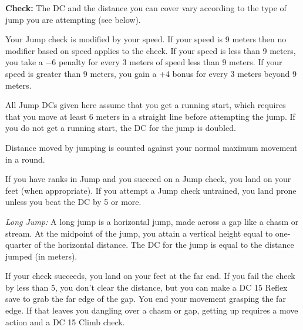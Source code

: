\textbf{Check:} The DC and the distance you can cover vary according to the type of jump you are attempting (see below).

Your Jump check is modified by your speed. If your speed is 9 meters then no modifier based on speed applies to the check. If your speed is less than 9 meters, you take a $-6$ penalty for every 3 meters of speed less than 9 meters. If your speed is greater than 9 meters, you gain a +4 bonus for every 3 meters beyond 9 meters.

All Jump DCs given here assume that you get a running start, which requires that you move at least 6 meters in a straight line before attempting the jump. If you do not get a running start, the DC for the jump is doubled.

Distance moved by jumping is counted against your normal maximum movement in a round.

If you have ranks in Jump and you succeed on a Jump check, you land on your feet (when appropriate). If you attempt a Jump check untrained, you land prone unless you beat the DC by 5 or more.


\textit{Long Jump:} A long jump is a horizontal jump, made across a gap like a chasm or stream. At the midpoint of the jump, you attain a vertical height equal to one-quarter of the horizontal distance. The DC for the jump is equal to the distance jumped (in meters).

If your check succeeds, you land on your feet at the far end. If you fail the check by less than 5, you don't clear the distance, but you can make a DC 15 Reflex save to grab the far edge of the gap. You end your movement grasping the far edge. If that leaves you dangling over a chasm or gap, getting up requires a move action and a DC 15 Climb check.


